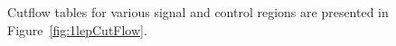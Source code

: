\label{subsec:cutflows}

Cutflow tables for various signal and control regions are presented in Figure~\ref{fig:1lepCutFlow}.


